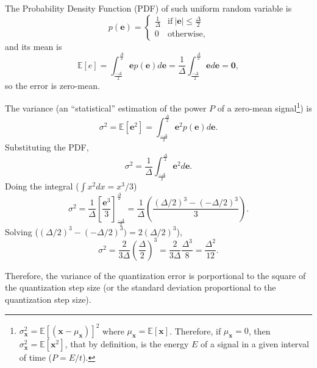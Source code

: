 The Probability Density Function (PDF) of such uniform random variable is
\begin{equation}
  p(\mathbf{e})=\left\{ \begin{array}{cl}
\frac{1}{\Delta} & \text{if} \ |\mathbf{e}| \leq \frac{\Delta}{2} \\
0 & \text{otherwise,}
  \end{array} \right.
\end{equation}
and its mean is
\begin{equation}
  \mathbb{E}[e] = \int_{\frac{-\Delta}{2}}^{\frac{\Delta}{2}}\mathbf{e}p(\mathbf{e})d\mathbf{e} = \frac{1}{\Delta}\int_{\frac{-\Delta}{2}}^{\frac{\Delta}{2}}\mathbf{e}d\mathbf{e}=\mathbf{0},
\end{equation}
so the error is zero-mean.

The variance (an ``statistical'' estimation of the power $P$ of a zero-mean signal\footnote{$\sigma^2_{\mathbf{x}}=\mathbb{E}[(\mathbf{x}-\mu_{\mathbf{x}})]^2$ where $\mu_{\mathbf{x}}=\mathbb{E}[\mathbf{x}]$. Therefore, if $\mu_{\mathbf{x}}=0$, then $\sigma^2_{\mathbf{x}}=\mathbb{E}[\mathbf{x}^2]$, that by definition, is the energy $E$ of a signal in a given interval of time ($P=E/t$).}) is
\begin{equation}
  \sigma^2 = \mathbb{E}[\mathbf{e}^2] = \int_{\frac{-\Delta}{2}}^{\frac{\Delta}{2}}\mathbf{e}^2p(\mathbf{e})d\mathbf{e}.
\end{equation}
Substituting the PDF,
\begin{equation}
  \sigma^2 = \frac{1}{\Delta}\int_{\frac{-\Delta}{2}}^{\frac{\Delta}{2}}\mathbf{e}^2d\mathbf{e}.
\end{equation}
Doing the integral ($\int x^2dx = x^3/3$)
\begin{equation}
  \sigma^2 = \frac{1}{\Delta}\left[\frac{\mathbf{e}^3}{3}\right]_{\frac{-\Delta}{2}}^{\frac{\Delta}{2}} = \frac{1}{\Delta}\left(\frac{(\Delta/2)^3-(-\Delta/2)^3}{3}\right).
\end{equation}
Solving ($(\Delta/2)^3-(-\Delta/2)^3) = 2(\Delta/2)^3$),
\begin{equation}
  \sigma^2 = \frac{2}{3\Delta}\left(\frac{\Delta}{2}\right)^3 = \frac{2}{3\Delta} \frac{\Delta^3}{8} = \frac{\Delta^2}{12}.
\end{equation}

Therefore, the variance of the quantization error is porportional to
the square of the quantization step size (or the standard deviation
proportional to the quantization step size).


